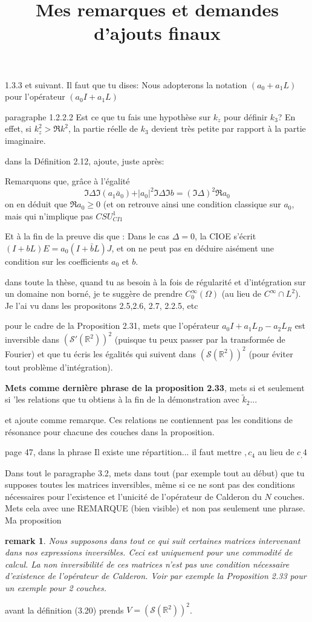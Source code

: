 \documentclass{article}
\title{Mes remarques et demandes d'ajouts finaux}
\date{}
\newtheorem{remark}{remark}
\newcommand{\R}{\mathbb{R}}
\begin{document}
\maketitle

1.3.3 et suivant. Il faut que tu dises: Nous adopterons la notation $(a_0+a_1L)$ pour l'opérateur $(a_0I+a_1L)$

paragraphe 1.2.2.2 Est ce que tu fais une hypothèse sur $k_z$ pour définir $k_3$? En effet, si $k_z^2>\Re k^2$, la partie réelle de $k_3$ devient très petite par rapport à la partie imaginaire.

dans la Définition 2.12, ajoute, juste après:

Remarquons que, grâce à l'égalité
$$\Im \Delta \Im (a_1{\bar a}_0)+\vert a_0\vert^2\Im \Delta\Im b= (\Im \Delta)^2\Re a_0$$
on en déduit que $\Re a_0\geq 0$ (et on retrouve ainsi une condition classique sur $a_0$, mais qui n'implique pas $CSU^1_{CI1}$

Et à la fin de la preuve dis que : Dans le cas $\Delta=0$, la CIOE s'écrit $(I+bL)E=a_0(I+{\bar b}L)J$, et on ne peut pas en déduire aisément une condition sur les coefficients $a_0$ et $b$.

dans toute la thèse, quand tu as besoin à la fois de régularité et d'intégration sur un domaine non borné, je te suggère de prendre $C^{\infty}_0(\Omega)$ (au lieu de $C^{\infty}\cap L^2$). Je l'ai vu dans les propositons 2.5,2.6, 2.7, 2.2.5, etc

pour le cadre de la Proposition 2.31, mets que l'opérateur $a_0I+a_1L_D-a_2L_R$ est inversible dans $(\mathcal{S}'(\R^2))^2$ (puisque tu peux passer par la transformée de Fourier) et que tu écris les égalités qui suivent dans $(\mathcal{S}(\R^2))^2$ (pour éviter tout problème d'intégration).


{\bf Mets comme dernière phrase de la proposition 2.33}, mets
si et seulement si  'les relations que tu obtiens à la fin de la démonstration avec ${\tilde k_2}...$

et ajoute comme remarque. Ces relations ne contiennent pas les conditions de résonance pour chacune des couches dans la proposition.

page 47, dans la phrase Il existe une répartition... il faut mettre $,c_4$ au lieu de $c_,4$

Dans tout le paragraphe 3.2, mets dans tout (par exemple tout au début) que tu supposes toutes les matrices inversibles, même si ce ne sont pas des conditions nécessaires pour l'existence et l'unicité de l'opérateur de Calderon du $N$ couches. Mets cela avec une REMARQUE (bien visible) et non pas seulement une phrase. Ma proposition
\begin{remark}
Nous supposons dans tout ce qui suit certaines matrices intervenant dans nos expressions inversibles. Ceci est uniquement pour une commodité de calcul. La non inversibilité de ces matrices n'est pas une condition nécessaire d'existence de l'opérateur de Calderon. Voir par exemple la Proposition 2.33 pour un exemple pour 2 couches.

\end{remark}
avant la définition (3.20) prends $V=(\mathcal{S}(\R^2))^2$.
\end{document}
